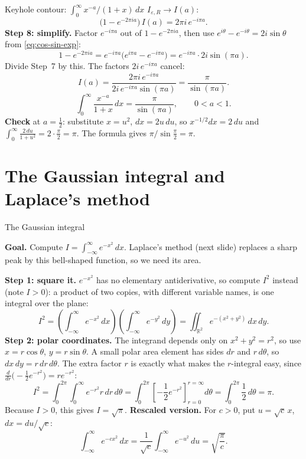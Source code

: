 \documentclass[11pt]{beamer}
\begin{document}
\begin{frame}[allowframebreaks=1.00]{Keyhole contour: $\int_0^\infty x^{-a}/(1+x)\,dx$}
\(I_{\varepsilon,R}\to I(a)\):
\[
 \bigl(1-e^{-2\pi ia}\bigr)\,I(a)=2\pi i\,e^{-i\pi a}.
\]
\textbf{Step 8: simplify.} Factor \(e^{-i\pi a}\) out of \(1-e^{-2\pi ia}\), then use
\(e^{i\theta}-e^{-i\theta}=2i\sin\theta\) from \eqref{eq:cos-sin-exp}:
\[
 1-e^{-2\pi ia}=e^{-i\pi a}\bigl(e^{i\pi a}-e^{-i\pi a}\bigr)=e^{-i\pi a}\cdot2i\sin(\pi a).
\]
Divide Step~7 by this. The factors \(2i\,e^{-i\pi a}\) cancel:
\[
 I(a)=\frac{2\pi i\,e^{-i\pi a}}{2i\,e^{-i\pi a}\sin(\pi a)}=\frac{\pi}{\sin(\pi a)}.
\]
\begin{equation}
 \int_0^\infty\frac{x^{-a}}{1+x}\,dx
 =\frac{\pi}{\sin(\pi a)},\qquad 0<a<1.
 \label{eq:keyhole2}
\end{equation}
\textbf{Check} at \(a=\frac12\): substitute \(x=u^2\), \(dx=2u\,du\), so \(x^{-1/2}dx=2\,du\) and
\(\int_0^\infty\frac{2\,du}{1+u^2}=2\cdot\frac\pi2=\pi\). The formula gives \(\pi/\sin\frac\pi2=\pi\).
\end{frame}



\section{The Gaussian integral and Laplace's method}


\begin{frame}[allowframebreaks=1.00]{The Gaussian integral}
\footnotesize

\textbf{Goal.} Compute \(I=\int_{-\infty}^{\infty}e^{-x^2}\,dx\). Laplace's method (next slide) replaces a sharp
peak by this bell-shaped function, so we need its area.

\textbf{Step 1: square it.} \(e^{-x^2}\) has no elementary antiderivative, so compute \(I^2\) instead
(note \(I>0\)): a product of two copies, with different variable names, is one integral over the plane:
\[
  I^2
   =\left(\int_{-\infty}^{\infty}e^{-x^2}\,dx\right)
     \left(\int_{-\infty}^{\infty}e^{-y^2}\,dy\right)
    =\iint_{\mathbb R^2}e^{-(x^2+y^2)}\,dx\,dy.
\]
\textbf{Step 2: polar coordinates.} The integrand depends only on \(x^2+y^2=r^2\), so use
\(x=r\cos\theta\), \(y=r\sin\theta\). A small polar area element has sides \(dr\) and \(r\,d\theta\), so
\(dx\,dy=r\,dr\,d\theta\). The extra factor \(r\) is exactly what makes the \(r\)-integral easy, since
\(\frac{d}{dr}\bigl(-\tfrac12e^{-r^2}\bigr)=re^{-r^2}\):
\[
  I^2
   =\int_0^{2\pi}\!\!\int_0^\infty e^{-r^2}r\,dr\,d\theta
   =\int_0^{2\pi}\left[-\frac12e^{-r^2}\right]_{r=0}^{r=\infty}d\theta
   =\int_0^{2\pi}\frac12\,d\theta
    =\pi .
\]
Because \(I>0\), this gives \(I=\sqrt\pi\).
\textbf{Rescaled version.} For \(c>0\), put \(u=\sqrt c\,x\), \(dx=du/\sqrt c\):
\begin{equation}
  \int_{-\infty}^{\infty}e^{-cx^2}\,dx=\frac1{\sqrt c}\int_{-\infty}^{\infty}e^{-u^2}\,du=\sqrt{\frac{\pi}{c}} .
  \label{eq:gauss-c}
\end{equation}
\end{frame}
\end{document}
